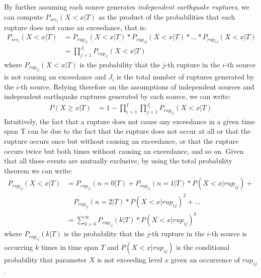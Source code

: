 By further assuming each source generates \textit{independent earthquake
ruptures}, we can compute $P_{src_{i}}(X < x | T)$ as the product of the
probabilities that each rupture does not cause an exceedance, that is:
\begin{align}
\label{eq:prup_noexceed_src}
P_{src_{i}}(X < x | T) & = P_{rup_{i1}}(X < x | T) * P_{rup_{i2}}(X < x | T) * ... * P_{rup_{iJ}}(X < x | T) \nonumber \\
			        & = \prod_{j=1}^{J_{i}} P_{rup_{ij}}(X < x | T)
\end{align}
where $P_{rup_{ij}}(X < x | T)$ is the probability that the $j$-th rupture in
the $i$-th source is not causing an exceedance and $J_{i}$ is the total number
of ruptures generated by the $i$-th source. Relying therefore on the assumptions
of independent sources and independent earthquake ruptures generated by each
source, we can write:
\begin{align}
\label{eq:hazard_eq_ind_srcs_rups}
P(X \ge x | T) & =  1 - \prod_{i=1}^{I} \prod_{j=1}^{J_{i}} P_{rup_{ij}}(X < x | T)
\end{align}
Intuitively, the fact that a rupture does not cause any exceedance in a given
time span T can be due to the fact that the rupture does not occur at all or
that the rupture occurs once but without causing an exceedance, or that the
rupture occurs twice but both times without causing an exceedance, and so on.
Given that all these events are mutually exclusive, by using the total
probability theorem we can write:
\begin{align}
\label{eq:prup_noexceed_rup}
P_{rup_{ij}}(X < x | T) & = P_{rup_{ij}}(n = 0 | T) + P_{rup_{ij}}(n = 1 | T) * P(X < x | rup_{ij}) + \nonumber \\
                                &\quad	P_{rup_{ij}}(n = 2 | T) * P(X < x | rup_{ij})^{2}  + ... \nonumber \\
				 & = \sum_{k=0}^{\infty} P_{rup_{ij}}(k | T) * P(X < x | rup_{ij}) ^ {k} 
\end{align}
where $P_{rup_{ij}}(k | T)$ is the probability that the $j$-th rupture in the
$i$-th source is occurring $k$ times in time span $T$ and $P(X < x | rup_{ij})$
is the conditional probability that parameter $X$ is not exceeding level $x$
given an occurrence of $rup_{ij}$.

